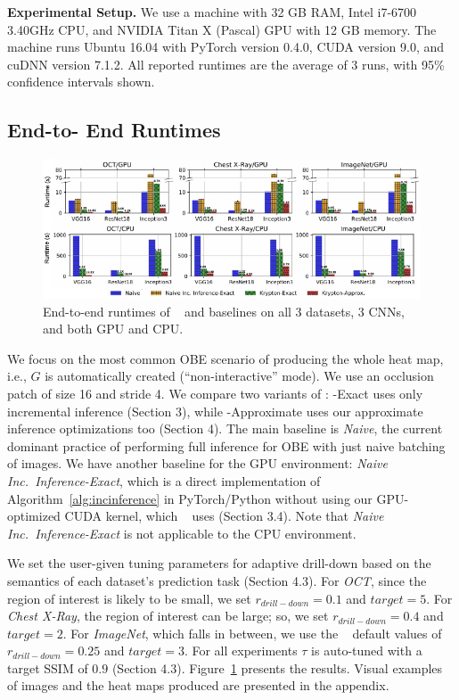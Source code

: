 \vspace{2mm}
\noindent \textbf{Experimental Setup.}
We use a machine with 32 GB RAM, Intel i7-6700 3.40GHz CPU, and NVIDIA Titan X (Pascal) GPU with 12 GB memory. %
The machine runs Ubuntu 16.04 with PyTorch version 0.4.0, CUDA version 9.0, and cuDNN version 7.1.2.
All reported runtimes are the average of 3 runs, with 95\% confidence intervals shown.

\vspace{-2mm}
\subsection{End-to- End Runtimes}

\begin{figure}[t]
\includegraphics[width=\textwidth]{images/5_1_all_edited_b}
\vspace{-6mm}
\caption{End-to-end runtimes of \system~ and baselines on all 3 datasets, 3 CNNs, and both GPU and CPU.}
\label{fig:5_1_all_edited}
\end{figure}

We focus on the most common OBE scenario of producing the whole heat map, i.e., $G$ is automatically created (``non-interactive'' mode). We use an occlusion patch of size 16 and stride 4. We compare two variants of \system: \system-Exact uses only incremental inference (Section 3), while \system-Approximate uses our approximate inference optimizations too (Section 4). The main baseline is \textit{Naive}, the current dominant practice of performing full inference for OBE with just naive batching of images. We have another baseline for the GPU environment: \textit{Naive Inc.~Inference-Exact}, which is a direct implementation of Algorithm~\ref{alg:incinference} in PyTorch/Python without using our GPU-optimized CUDA kernel, which \system~ uses (Section 3.4). Note that \textit{Naive Inc.~Inference-Exact} is not applicable to the CPU environment.

We set the user-given tuning parameters for adaptive drill-down based on the semantics of each dataset's prediction task (Section 4.3). For \textit{OCT}, since the region of interest is likely to be small, we set $r_{drill-down}=0.1$ and $\mathit{target} = 5$. For \textit{Chest X-Ray}, the region of interest can be large; so, we set $r_{drill-down} = 0.4$ and $\mathit{target} = 2$. For \textit{ImageNet}, which falls in between, we use the \system~ default values of $r_{drill-down}=0.25$  and $\mathit{target} = 3$. For all experiments $\tau$ is auto-tuned with a target SSIM of $0.9$ (Section 4.3). Figure~\ref{fig:5_1_all_edited} presents the results. Visual examples of images and the heat maps produced are presented in the appendix.

